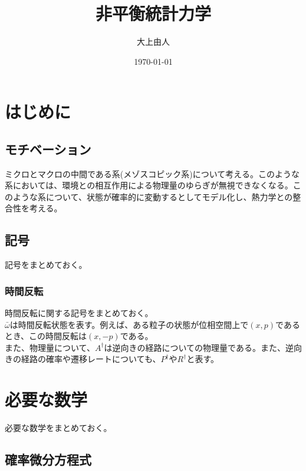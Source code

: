 \documentclass[a4paper,11pt]{jsarticle}
\numberwithin{equation}{section}
\begin{document}
\title{非平衡統計力学}
\author{大上由人}
\date{\today}
\maketitle

\tableofcontents
\newpage


\section{はじめに}
\subsection{モチベーション}
ミクロとマクロの中間である系(メゾスコピック系)について考える。このような系においては、環境との相互作用による物理量のゆらぎが無視できなくなる。このような系について、状態が確率的に変動するとしてモデル化し、熱力学との整合性を考える。\\

\subsection{記号}
記号をまとめておく。\\

\subsubsection{時間反転}
時間反転に関する記号をまとめておく。\\
$\bar{\omega}$は時間反転状態を表す。例えば、ある粒子の状態が位相空間上で$(x,p)$であるとき、この時間反転は$(x,-p)$である。\\
また、物理量について、$A^{\dagger}$は逆向きの経路についての物理量である。また、逆向きの経路の確率や遷移レートについても、$P^{\dagger}$や$R^{\dagger}$と表す。\\

\section{必要な数学}
必要な数学をまとめておく。\\

\subsection{確率微分方程式}
\end{document}
